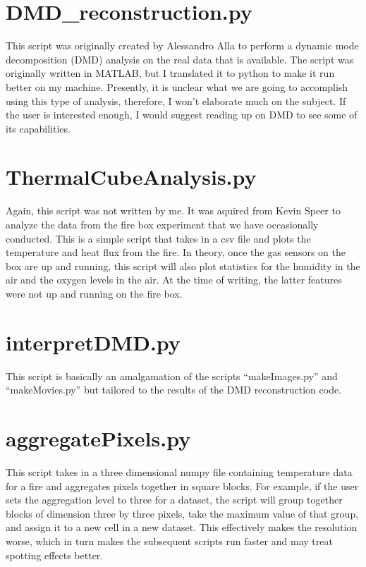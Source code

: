 \documentclass{article}
\begin{document}
\section{DMD\_reconstruction.py}

This script was originally created by Alessandro Alla to perform a dynamic mode decomposition (DMD) analysis on the real data that is available. The script was originally written in MATLAB, but I translated it to python to make it run better on my machine. Presently, it is unclear what we are going to accomplish using this type of analysis, therefore, I won't elaborate much on the subject. If the user is interested enough, I would suggest reading up on DMD to see some of its capabilities. 

\section{ThermalCubeAnalysis.py}
Again, this script was not written by me. It was aquired from Kevin Speer to analyze the data from the fire box experiment that we have occasionally conducted. This is a simple script that takes in a csv file and plots the temperature and heat flux from the fire. In theory, once the gas sensors on the box are up and running, this script will also plot statistics for the humidity in the air and the oxygen levels in the air. At the time of writing, the latter features were not up and running on the fire box.

\section{interpretDMD.py}
This script is basically an amalgamation of the scripts ``makeImages.py'' and ``makeMovies.py'' but tailored to the results of the DMD reconstruction code. 

\section{aggregatePixels.py}

This script takes in a three dimensional numpy file containing temperature data for a fire and aggregates pixels together in square blocks. For example, if the user sets the aggregation level to three for a dataset, the script will group together blocks of dimension three by three pixels, take the maximum value of that group, and assign it to a new cell in a new dataset. This effectively makes the resolution worse, which in turn makes the subsequent scripts run faster and may treat spotting effects better. 
\end{document}

